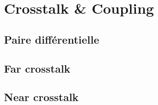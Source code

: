 
\section{Crosstalk \& Coupling}
\subsection{Paire différentielle}
\subsection{Far crosstalk}
\subsection{Near crosstalk}
